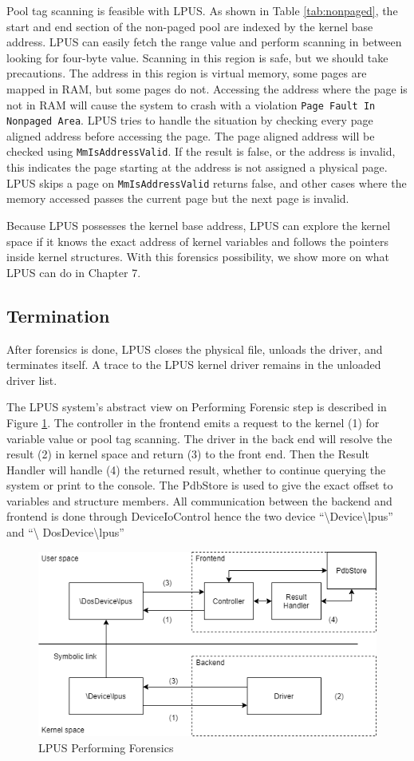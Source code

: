 Pool tag scanning is feasible with LPUS. As shown in Table \ref{tab:nonpaged},
the start and end section of the non-paged pool are indexed by the kernel base
address. LPUS can easily fetch the range value and perform scanning in between
looking for four-byte value. Scanning in this region is safe, but we should
take precautions. The address in this region is virtual memory, some pages are
mapped in RAM, but some pages do not. Accessing the address where the page is
not in RAM will cause the system to crash with a violation \texttt{Page Fault
In Nonpaged Area}. LPUS tries to handle the situation by checking every page
aligned address before accessing the page. The page aligned address will be
checked using \texttt{MmIsAddressValid}. If the result is false, or the address
is invalid, this indicates the page starting at the address is not assigned a
physical page. LPUS skips a page on \texttt{MmIsAddressValid} returns false,
and other cases where the memory accessed passes the current page but the next
page is invalid.

Because LPUS possesses the kernel base address, LPUS can explore the kernel
space if it knows the exact address of kernel variables and follows the
pointers inside kernel structures. With this forensics possibility, we show
more on what LPUS can do in Chapter 7.

\subsection[Termination]{Termination}

After forensics is done, LPUS closes the physical file, unloads the driver, and
terminates itself. A trace to the LPUS kernel driver remains in the unloaded
driver list.

The LPUS system's abstract view on Performing Forensic step is described in
Figure \ref{fig:lpus}. The controller in the frontend emits a request to the
kernel (1) for variable value or pool tag scanning. The driver in the back end
will resolve the result (2) in kernel space and return (3) to the front end.
Then the Result Handler will handle (4) the returned result, whether to
continue querying the system or print to the console. The PdbStore is used to
give the exact offset to variables and structure members.  All communication
between the backend and frontend is done through DeviceIoControl hence the two
device ``\textbackslash Device\textbackslash lpus'' and ``\textbackslash
DosDevice\textbackslash lpus''

\begin{figure}[h]
  \centering
  \caption{LPUS Performing Forensics}
  \label{fig:lpus}
  \includegraphics[scale=0.7]{images/lpus.png}
\end{figure}
